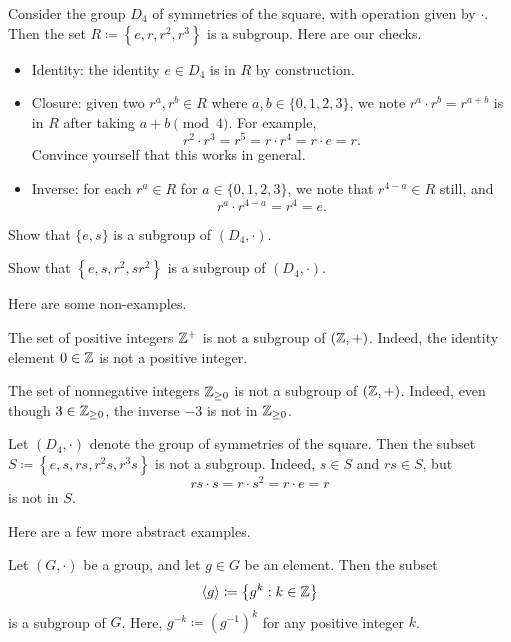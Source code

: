 \documentclass[../notes.tex]{subfiles}
\begin{document}
\begin{example}
    Consider the group $D_4$ of symmetries of the square, with operation given by $\cdot$. Then the set $R\coloneqq\left\{e,r,r^2,r^3\right\}$ is a subgroup. Here are our checks.
    \begin{itemize}
        \item Identity: the identity $e\in D_4$ is in $R$ by construction.
        \item Closure: given two $r^a,r^b\in R$ where $a,b\in\{0,1,2,3\}$, we note $r^a\cdot r^b=r^{a+b}$ is in $R$ after taking $a+b\pmod4$. For example,
        \[r^2\cdot r^3=r^5=r\cdot r^4=r\cdot e=r.\]
        Convince yourself that this works in general.
        \item Inverse: for each $r^a\in R$ for $a\in\{0,1,2,3\}$, we note that $r^{4-a}\in R$ still, and
        \[r^a\cdot r^{4-a}=r^4=e.\]
    \end{itemize}
\end{example}
\begin{exe}
    Show that $\{e,s\}$ is a subgroup of $(D_4,\cdot)$.
\end{exe}
\begin{exe} \label{exe:klein-four}
    Show that $\left\{e,s,r^2,sr^2\right\}$ is a subgroup of $(D_4,\cdot)$.
\end{exe}
Here are some non-examples.
\begin{nex}
    The set of positive integers $\mathbb Z^+$ is not a subgroup of $(\mathbb Z,+)$. Indeed, the identity element $0\in\mathbb Z$ is not a positive integer.
\end{nex}
\begin{nex}
    The set of nonnegative integers $\mathbb Z_{\ge0}$ is not a subgroup of $(\mathbb Z,+)$. Indeed, even though $3\in\mathbb Z_{\ge0}$, the inverse $-3$ is not in $\mathbb Z_{\ge0}$.
\end{nex}
\begin{nex}
    Let $(D_4,\cdot)$ denote the group of symmetries of the square. Then the subset $S\coloneqq\left\{e,s,rs,r^2s,r^3s\right\}$ is not a subgroup. Indeed, $s\in S$ and $rs\in S$, but
    \[rs\cdot s=r\cdot s^2=r\cdot e=r\]
    is not in $S$.
\end{nex}
Here are a few more abstract examples.
\begin{proposition} \label{prop:cyclic-subgroup}
    Let $(G,\cdot)$ be a group, and let $g\in G$ be an element. Then the subset
    \[\langle g\rangle\coloneqq\left\{g^k:k\in\mathbb Z\right\}\]
    is a subgroup of $G$. Here, $g^{-k}\coloneqq\left(g^{-1}\right)^k$ for any positive integer $k$.
\end{proposition}
\end{document}
